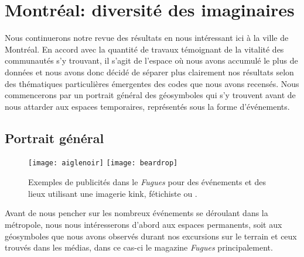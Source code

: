 \section{Montréal: diversité des imaginaires}
\label{sec:montr_al_diversit_des_imaginaires}

Nous continuerons notre revue des résultats en nous intéressant ici à la ville de Montréal.
En accord avec la quantité de travaux témoignant de la vitalité des communautés \lgbt s'y trouvant, il s'agit de l'espace où nous avons accumulé le plus de données et nous avons donc décidé de séparer plus clairement nos résultats selon des thématiques particulières émergentes des codes que nous avons recensés.
Nous commencerons par un portrait général des géosymboles qui s'y trouvent avant de nous attarder aux espaces temporaires, représentés sous la forme d'événements.

\subsection{Portrait général}
\label{subsec:portraitgeneralmtl}

\begin{figure}[ht]
 \centering
 {\texttt{[image: aiglenoir]}}
 {\texttt{[image: beardrop]}}
 \caption[Publicités utilisant une imagerie \textsc{bdsm}]{Exemples de publicités dans le \emph{Fugues} pour des événements et des lieux utilisant une imagerie kink, fétichiste ou \bdsm{}.}\label{figs:fetichisme}
\end{figure}

Avant de nous pencher sur les nombreux événements se déroulant dans la métropole, nous nous intéresserons d'abord aux espaces permanents, soit aux géosymboles que nous avons observés durant nos excursions sur le terrain et ceux trouvés dans les médias, dans ce cas-ci le magazine \emph{Fugues} principalement.

